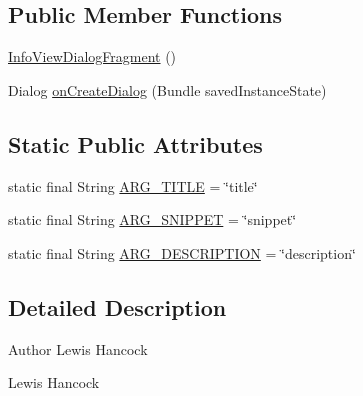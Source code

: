 \subsection*{Public Member Functions}
\begin{DoxyCompactItemize}
\item 
\hyperlink{classuk_1_1ac_1_1swan_1_1digitaltrails_1_1fragments_1_1_info_view_dialog_fragment_a72f8ccaadba3a2adc3b19f2f89de8c6f}{Info\+View\+Dialog\+Fragment} ()
\item 
Dialog \hyperlink{classuk_1_1ac_1_1swan_1_1digitaltrails_1_1fragments_1_1_info_view_dialog_fragment_a4a698516f20b8d5b553956766ceca0dd}{on\+Create\+Dialog} (Bundle saved\+Instance\+State)
\end{DoxyCompactItemize}
\subsection*{Static Public Attributes}
\begin{DoxyCompactItemize}
\item 
static final String \hyperlink{classuk_1_1ac_1_1swan_1_1digitaltrails_1_1fragments_1_1_info_view_dialog_fragment_abc5f258510b73a9b73edf43223860fd7}{A\+R\+G\+\_\+\+T\+I\+T\+L\+E} = \char`\"{}title\char`\"{}
\item 
static final String \hyperlink{classuk_1_1ac_1_1swan_1_1digitaltrails_1_1fragments_1_1_info_view_dialog_fragment_a6fda7d7dba66616acccb7827c156a396}{A\+R\+G\+\_\+\+S\+N\+I\+P\+P\+E\+T} = \char`\"{}snippet\char`\"{}
\item 
static final String \hyperlink{classuk_1_1ac_1_1swan_1_1digitaltrails_1_1fragments_1_1_info_view_dialog_fragment_ac293f1004ca9b6d9ad5f33d9a1a951a0}{A\+R\+G\+\_\+\+D\+E\+S\+C\+R\+I\+P\+T\+I\+O\+N} = \char`\"{}description\char`\"{}
\end{DoxyCompactItemize}


\subsection{Detailed Description}
\begin{DoxyAuthor}{Author}
Lewis Hancock

Lewis Hancock 
\end{DoxyAuthor}



